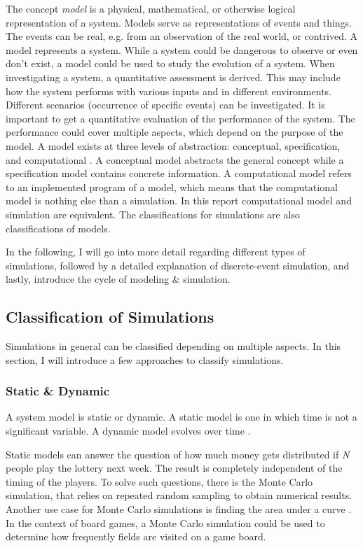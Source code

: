 The concept \textit{model} is a physical, mathematical, or otherwise logical
representation of a system. Models serve as representations of events and things. The events can be real, e.g. from an observation of the real world, or contrived. A model represents a system.
While a system could be dangerous to observe or even don't exist, a model could be used to study the evolution of a system. When investigating a system, a quantitative assessment is derived. This may include how the system performs with various inputs and in different environments.
Different scenarios (occurrence of specific events) can be investigated.  It is important to get a quantitative evaluation of the performance of the system. The performance could cover multiple aspects, which depend on the purpose of the model.
A model exists at three levels of abstraction: conceptual, specification, and computational \cite[chapter 1]{leemis2006discrete}. A conceptual model abstracts the general concept while a specification model contains concrete information. A computational model refers to an implemented program of a model, which means that the computational model is nothing else than a simulation. In this report computational model and simulation are equivalent. The classifications for simulations are also classifications of models.

In the following, I will go into more detail regarding different types of simulations, followed by a detailed explanation of discrete-event simulation, and lastly, introduce the cycle of modeling \& simulation.


\subsection{Classification of Simulations}


Simulations in general can be classified depending on multiple aspects. In this section, I will introduce a few approaches to classify simulations.

\subsubsection{Static \& Dynamic}

A system model is static or dynamic. A static model is one in which time
is not a significant variable. A dynamic model evolves over time \cite[chapter 1]{leemis2006discrete}.

Static models can answer the question of how much money gets distributed if \textit{N} people play the lottery next week. The result is completely independent of the timing of the players.
To solve such questions, there is the Monte Carlo simulation, that relies on repeated random sampling to obtain numerical results. Another use case for Monte Carlo simulations is finding the area under a curve \cite{ohriner1971finding}. In the context of board games, a Monte Carlo simulation could be used to determine how frequently fields are visited on a game board. 

